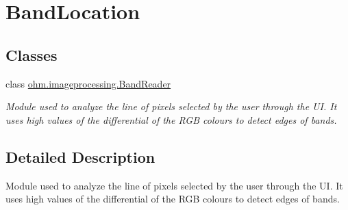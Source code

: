 \hypertarget{group___band_location}{}\section{Band\+Location}
\label{group___band_location}
\subsection*{Classes}
\begin{DoxyCompactItemize}
\item 
class \hyperlink{classohm_1_1imageprocessing_1_1_band_reader}{ohm.\+imageprocessing.\+Band\+Reader}
\begin{DoxyCompactList}\small\item\em Module used to analyze the line of pixels selected by the user through the UI. It uses high values of the differential of the R\+GB colours to detect edges of bands. \end{DoxyCompactList}\end{DoxyCompactItemize}


\subsection{Detailed Description}
Module used to analyze the line of pixels selected by the user through the UI. It uses high values of the differential of the R\+GB colours to detect edges of bands. 